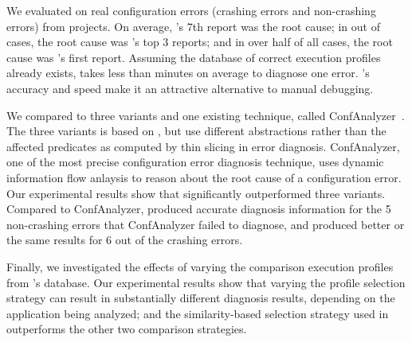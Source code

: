 We evaluated \ourtool on \errors real configuration errors
(\crash crashing errors and \noncrash non-crashing errors)
from \subjectnum projects.
On average, \ourtool's 7th report was the root cause; in
\topnum out of \errors cases, the root cause was \ourtool's
top 3 reports; and in over half of all
cases, the root cause was \ourtool's first report.
Assuming the database of correct execution profiles already exists,
\ourtool takes less than \avgtime minutes on average to diagnose
one error.  \ourtool's accuracy and speed make it an attractive alternative
to manual debugging.


We compared \ourtool to three variants and one existing
technique, called ConfAnalyzer~\cite{Rabkin:2011:PPC}.
The three variants is based on \ourtool, but use different
abstractions rather than
the affected predicates as computed by thin slicing in
error diagnosis. ConfAnalyzer, one of the most precise
configuration error diagnosis technique, uses dynamic
information flow anlaysis to reason about the root cause of a
configuration error.
Our experimental results show that \ourtool significantly
outperformed three variants.
Compared to ConfAnalyzer,
\ourtool produced accurate diagnosis information for the 5
non-crashing errors that ConfAnalyzer failed to diagnose,
and produced better or the same results
for 6 out of the \crash crashing errors. 



Finally, we investigated the effects of varying the comparison execution profiles
from \ourtool's database.
Our experimental results show that varying the
profile selection strategy can result in substantially different
diagnosis results, depending on the application being analyzed;
and the similarity-based selection strategy used in \ourtool outperforms
the other two comparison strategies.




